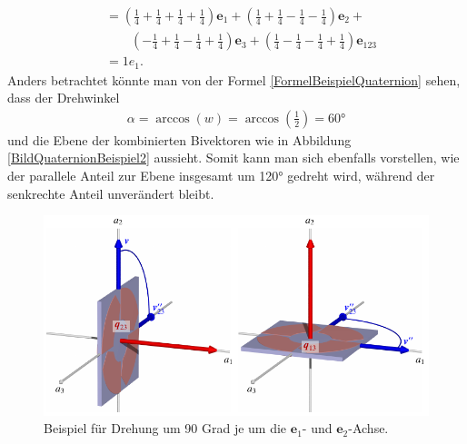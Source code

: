 \begin{beispiel}
\begin{align}
	&= (\textstyle{\frac{1}{4}} + \textstyle{\frac{1}{4}} + \textstyle{\frac{1}{4}} + \textstyle{\frac{1}{4}})\mathbf{e}_1 + (\textstyle{\frac{1}{4}} + \textstyle{\frac{1}{4}} - \textstyle{\frac{1}{4}} - \textstyle{\frac{1}{4}})\mathbf{e}_2 +\\ &\qquad(-\textstyle{\frac{1}{4}} + \textstyle{\frac{1}{4}} - \textstyle{\frac{1}{4}} + \textstyle{\frac{1}{4}})\mathbf{e}_3 + (\textstyle{\frac{1}{4}} - \textstyle{\frac{1}{4}} - \textstyle{\frac{1}{4}} + \textstyle{\frac{1}{4}})\mathbf{e}_{123}\\
	&= 1e_1. 
	\end{align}
	Anders betrachtet könnte man von der Formel \eqref{FormelBeispielQuaternion} sehen, dass der Drehwinkel
	\begin{align}
	\alpha = \arccos(w) = \arccos(\textstyle{\frac{1}{2}}) = 60°
	\end{align}
	und die Ebene der kombinierten Bivektoren wie in Abbildung \ref{BildQuaternionBeispiel2} aussieht.
	Somit kann man sich ebenfalls vorstellen, wie der parallele Anteil zur Ebene insgesamt um 120° gedreht wird, während der senkrechte Anteil unverändert bleibt.
\end{beispiel}

\begin{figure}
	\centering
	\includegraphics{papers/clifford/3d/qq.pdf}
	
	\caption{Beispiel für Drehung um 90 Grad je um die $\mathbf{e}_1$- und $\mathbf{e}_2$-Achse.}
	\label{BildQuaternionBeispiel}
\end{figure}

